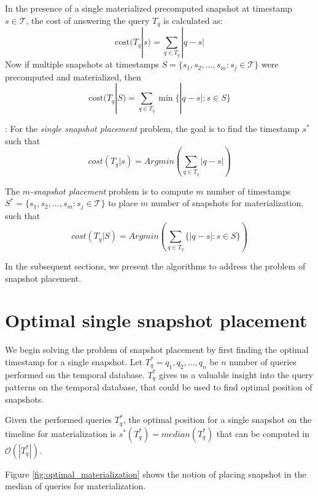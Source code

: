 			\begin{defn} 
				In the presence of a single materialized precomputed snapshot at timestamp $s \in \mathcal{T}$, the cost of answering the query $T_q$ is calculated as:
				$$\mathrm{cost}(T_q | s) = \sum_{q\in T_q} |q - s|$$
				Now if multiple snapshots at timestamps $S=\{s_1, s_2, \dots, s_m : s_j \in \mathcal{T}\}$ were precomputed and materialized, then 
				$$\mathrm{cost}(T_q|S) = \sum_{q\in T_q} \min\{|q-s| : s\in S\}$$
			\label{defn:cost_of_query_answering}
			\end{defn}

			\begin{defn}: 
			    For the \emph{single snapshot placement} problem, the goal is to find the timestamp $s^*$ such that 
				$$cost(T_q|s)= Arg min(\sum_{q\in T_q}|q - s|)$$

				The \emph{$m$-snapshot placement} problem is to compute $m$ number of timestamps $S^*=\{s_1, s_2, \dots, s_m: s_j \in \mathcal{T}\}$ to place $m$ number of snapshots for materialization, such that 
				$$cost(T_q|S)= Arg min(\sum_{q\in T_q}\{|q - s|:s \in S\})$$
			\label{defn:optimal_snapshot_placement}
			\end{defn}

			In the subsequent sections, we present the algorithms to address the problem of snapshot placement.

	\section{Optimal single snapshot placement}
		We begin solving the problem of snapshot placement by first finding the optimal timestamp for a single snapshot. Let $T_q^* = {q_1,q_2, \dots , q_n}$ be $n$ number of queries performed on the temporal database. $T_q^*$ gives us a valuable insight into the query patterns on the temporal database, that could be used to find optimal position of snapshots.

		\begin{prop}
			Given the performed queries $T_q^*$, the optimal position for a single snapshot on the timeline for materialization is $s^*(T_q^*)=median(T_q^*)$ that can be computed in $\mathcal{O}(|T_q^*|)$. 
		\label{prop:compute-median}
		\end{prop}
		    
		Figure \ref{fig:optimal_materialization} shows the notion of placing snapshot in the median of queries for materialization.

